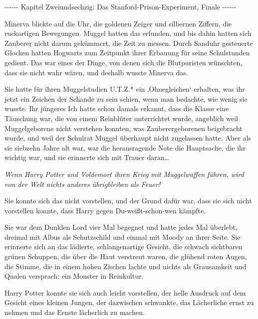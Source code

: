 

\hypertarget{das-stanford-prison-experiment-finale}{%

-\/-\/-\/-\/-\/- Kapitel Zweiundsechzig: Das Stanford-Prison-Experiment, Finale -\/-\/-\/-\/-\/-

Minerva blickte auf die Uhr, die goldenen Zeiger und silbernen Ziffern, die ruckartigen Bewegungen. Muggel hatten das erfunden, und bis dahin hatten sich Zauberer nicht darum gekümmert, die Zeit zu messen. Durch Sanduhr gesteuerte Glocken hatten Hogwarts zum Zeitpunkt ihrer Erbauung für seine Schulstunden gedient. Das war eines der Dinge, von denen sich die Blutpuristen wünschten, dass sie nicht wahr wären, und deshalb wusste Minerva das.

Sie hatte für ihren Muggelstudien U.T.Z.* ein ‚Ohnegleichen` erhalten, was ihr jetzt ein Zeichen der Schande zu sein schien, wenn man bedachte, wie wenig sie wusste. Ihr jüngeres Ich hatte schon damals erkannt, dass die Klasse eine Täuschung war, die von einem Reinblüter unterrichtet wurde, angeblich weil Muggelgeborene nicht verstehen konnten, was Zauberergeborenen beigebracht wurde, und weil der Schulrat Muggel überhaupt nicht zugelassen hatte. Aber als sie siebzehn Jahre alt war, war die herausragende Note die Hauptsache, die ihr wichtig war, und sie erinnerte sich mit Trauer daran…

\emph{Wenn Harry Potter und Voldemort ihren Krieg mit Muggelwaffen führen, wird von der Welt nichts anderes übrigbleiben als Feuer!}

Sie konnte sich das nicht vorstellen, und der Grund dafür war, dass sie sich nicht vorstellen konnte, dass Harry gegen Du-weißt-schon-wen kämpfte.

Sie war dem Dunklen Lord vier Mal begegnet und hatte jedes Mal überlebt, dreimal mit Albus als Schutzschild und einmal mit Moody an ihrer Seite. Sie erinnerte sich an das lädierte, schlangenartige Gesicht, die schwach sichtbaren grünen Schuppen, die über die Haut verstreut waren, die glühend roten Augen, die Stimme, die in einem hohen Zischen lachte und nichts als Grausamkeit und Qualen versprach: ein Monster in Reinkultur.

Harry Potter konnte sie sich auch leicht vorstellen, der helle Ausdruck auf dem Gesicht eines kleinen Jungen, der dazwischen schwankte, das Lächerliche ernst zu nehmen und das Ernste lächerlich zu machen.

}
